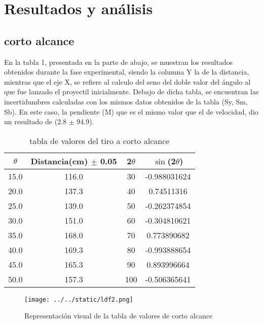 \documentclass{article}
\begin{document}
\section{Resultados y análisis}\label{Resultados}			%
\subsection*{corto alcance}
En la tabla 1, presentada en la parte de abajo, se muestran los resultados obtenidos durante la fase experimental, siendo la columna Y la de la distancia, mientras que el eje X, se refiere al calculo del seno del doble valor del ángulo al que fue lanzado el proyectil inicialmente. Debajo de dicha tabla, se encuentran las incertidumbres calculadas con los mismos datos obtenidos de la tabla (Sy, Sm, Sb). En este caso, la pendiente (M) que es el mismo valor que el de velocidad, dio un resultado de (2.8 $\pm$ 94.9).
\begin{table}[H]
	\centering
	\begin{tabular}{|c|c|c|c|}
		\hline
		$\theta$ & Distancia(cm) $\pm$ 0.05 & 2$\theta$ & $\sin$(2$\theta$)\\
		\hline	
		15.0 & 116.0 & 30 & -0.988031624 \\
		\hline
20.0 & 137.3 & 40 &  0.74511316 \\
		\hline
25.0 & 139.0 & 50 & -0.262374854 \\
		\hline
30.0 & 151.0 & 60 & -0.304810621 \\
		\hline
35.0 & 168.0 & 70 & 0.773890682 \\
		\hline
40.0 & 169.3 & 80 & -0.993888654 \\
		\hline
45.0 & 165.3 & 90 & 0.893996664 \\
		\hline
50.0 & 157.3 & 100 & -0.506365641 \\
		\hline
	\end{tabular}
	\caption{tabla de valores del tiro a corto alcance}
	\label{table:1}
\end{table}

\begin{figure}[h]
	\centering
	\texttt{[image: ../../static/ldf2.png]}
	\caption{Representación visual de la tabla de valores de corto alcance}
	\label{fig:2}
\end{figure}
\end{document}
